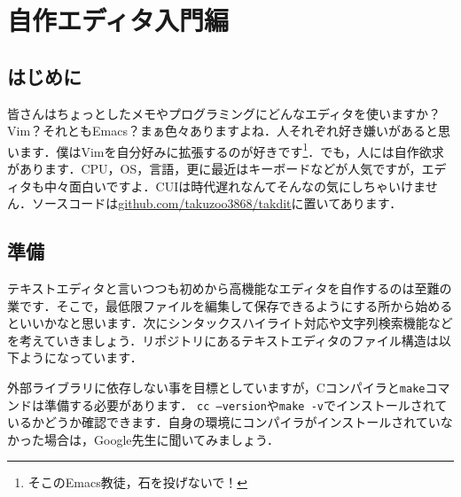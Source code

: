 \chapter{自作エディタ入門編}

\section{はじめに}
皆さんはちょっとしたメモやプログラミングにどんなエディタを使いますか？Vim？それともEmacs？まぁ色々ありますよね．人それぞれ好き嫌いがあると思います．僕はVimを自分好みに拡張するのが好きです\footnote{そこのEmacs教徒，石を投げないで！}．でも，人には自作欲求があります．CPU，OS，言語，更に最近はキーボードなどが人気ですが，エディタも中々面白いですよ．CUIは時代遅れなんてそんなの気にしちゃいけません．ソースコードは\href{https://github.com/takuzoo3868/takdit}{github.com/takuzoo3868/takdit}に置いてあります．

\section{準備}
テキストエディタと言いつつも初めから高機能なエディタを自作するのは至難の業です．そこで，最低限ファイルを編集して保存できるようにする所から始めるといいかなと思います．次にシンタックスハイライト対応や文字列検索機能などを考えていきましょう．リポジトリにあるテキストエディタのファイル構造は以下ようになっています．
\begin{figure}[H]
\end{figure}
外部ライブラリに依存しない事を目標としていますが，Cコンパイラと\texttt{make}コマンドは準備する必要があります．
\texttt{cc --version}や\texttt{make -v}でインストールされているかどうか確認できます．自身の環境にコンパイラがインストールされていなかった場合は，Google先生に聞いてみましょう．

